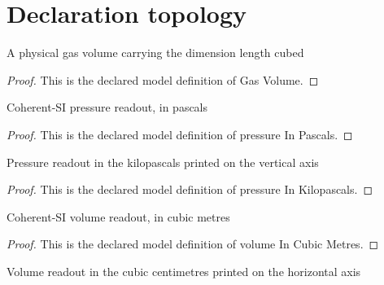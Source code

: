 \section{Declaration topology}
\begin{definition}
  \label{def:physics:phyx-mini-0428:phyxminiproblems-problemphyxmini0428-gasvolume}
  A physical gas volume carrying the dimension length cubed
\end{definition}
\begin{proof}
  This is the declared model definition of Gas Volume.
\end{proof}
\begin{definition}
  \label{def:physics:phyx-mini-0428:phyxminiproblems-problemphyxmini0428-pressureinpascals}
  Coherent-SI pressure readout, in pascals
\end{definition}
\begin{proof}
  This is the declared model definition of pressure In Pascals.
\end{proof}
\begin{definition}
  \label{def:physics:phyx-mini-0428:phyxminiproblems-problemphyxmini0428-pressureinkilopascals}
  Pressure readout in the kilopascals printed on the vertical axis
\end{definition}
\begin{proof}
  This is the declared model definition of pressure In Kilopascals.
\end{proof}
\begin{definition}
  \label{def:physics:phyx-mini-0428:phyxminiproblems-problemphyxmini0428-volumeincubicmetres}
  Coherent-SI volume readout, in cubic metres
\end{definition}
\begin{proof}
  This is the declared model definition of volume In Cubic Metres.
\end{proof}
\begin{definition}
  \label{def:physics:phyx-mini-0428:phyxminiproblems-problemphyxmini0428-volumeincubiccentimetres}
  Volume readout in the cubic centimetres printed on the horizontal axis
\end{definition}
